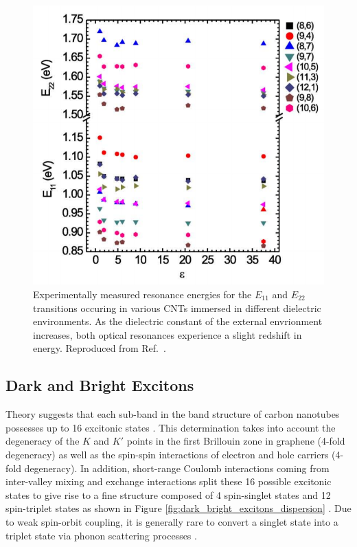 \begin{figure}[ht]
	\centering
	\includegraphics[scale=0.5]{images/chapter_optical_props/screening_ohno}
	\caption{Experimentally measured resonance energies for the $E_{11}$ and $E_{22}$ transitions occuring in various CNTs immersed in different dielectric environments. As the dielectric constant of the external envrionment increases, both optical resonances experience a slight redshift in energy. Reproduced from Ref.\ \cite{ohno2007excitonic}.}
\end{figure}

\clearpage

\subsection{Dark and Bright Excitons}

Theory suggests that each sub-band in the band structure of carbon nanotubes possesses up to 16 excitonic states \cite{amori2018excitons}. This determination takes into account the degeneracy of the $K$ and $K'$ points in the first Brillouin zone in graphene (4-fold degeneracy) as well as the spin-spin interactions of electron and hole carriers (4-fold degeneracy). In addition, short-range Coulomb interactions coming from inter-valley mixing and exchange interactions split these 16 possible excitonic states to give rise to a fine structure composed of 4 spin-singlet states and 12 spin-triplet states as shown in Figure \ref{fig:dark_bright_excitons_dispersion} \cite{ando2006effects}. Due to weak spin-orbit coupling, it is generally rare to convert a singlet state into a triplet state via phonon scattering processes \cite{amori2018excitons}.

